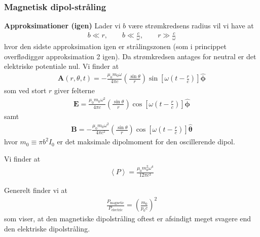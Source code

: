 \documentclass[a4paper]{article}
\begin{document}
    \subsubsection{Magnetisk dipol-stråling}
    \textbf{Approksimationer (igen)} 
    Lader vi \(b\) være strømkredsens radius vil vi have at \begin{align*}
        b \ll r, \qquad b \ll \frac{c}{\omega }, \qquad r \gg \frac{c}{\omega }
    \end{align*} 
    hvor den sidste approksimation igen er strålingszonen (som i princippet overflødiggør approksimation 2 igen). Da strømkredsen antages for neutral er det elektriske potentiale nul. Vi finder at \begin{align*}
        \boxed{\mathbf{A}(r, \theta , t) = - \frac{\mu _0 m_0 \omega }{4 \pi c} \left( \frac{\sin \theta }{r} \right) \sin \left[ \omega (t - \frac{r}{c}) \right] \boldsymbol{\hat{\phi}}} \tag{11.36}
    \end{align*}
    som ved stort \(r\) giver felterne \begin{align*}
        \boxed{\mathbf{E} = \frac{\mu _0 m_0 \omega^{2}  }{4 \pi c} \left( \frac{\sin \theta }{r} \right) \cos \left[ \omega (t - \frac{r}{c}) \right] \boldsymbol{\hat{\phi}}} \tag{11.36}
    \end{align*} 
    samt \begin{align*}
       \boxed{\mathbf{B} = -\frac{\mu _0 m_0 \omega ^{2} }{4 \pi  c^{2} } \left( \frac{\sin  \theta }{r} \right) \cos \left[ \omega (t - \frac{r}{c}) \right] \hat{\boldsymbol{\theta}}} \tag{11.37}
    \end{align*}
    hvor \(m_0 \equiv \pi  b^{2} I_0\) er det maksimale dipolmoment for den oscillerende dipol.

    Vi finder at \begin{align*}
        \left\langle P \right\rangle = \frac{\mu _0 m_0 ^{2} \omega ^4}{12 \pi  c^3} \tag{11.40}
    \end{align*}

    Generelt finder vi at \begin{align*}
        \frac{P_{\text{magnetic}}}{P_{\text{electric}}} = \left( \frac{m_0}{p_0 c} \right)^{2} \tag{11.41} 
    \end{align*}
    som viser, at den magnetiske dipolstråling oftest er afsindigt meget svagere end den elektriske dipolstråling.
\end{document}
